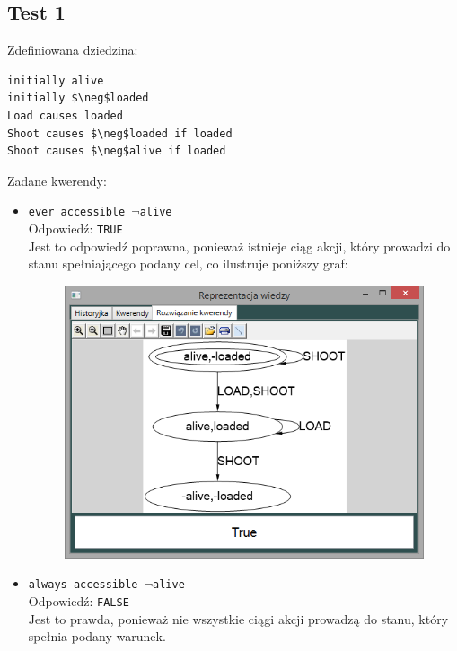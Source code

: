 \documentclass{article}
\begin{document}
\subsection{Test 1}
Zdefiniowana dziedzina:
\bigskip
{}
\begin{lstlisting}[mathescape=true]
initially alive
initially $\neg$loaded
Load causes loaded
Shoot causes $\neg$loaded if loaded
Shoot causes $\neg$alive if loaded
\end{lstlisting}
\vspace{1cm}
Zadane kwerendy:
\begin{itemize}
    \item {\large\texttt{ever accessible $\neg$alive}}\\
    Odpowiedź: \texttt{TRUE}\\
    Jest to odpowiedź poprawna, ponieważ istnieje ciąg akcji, który prowadzi do stanu spełniającego podany cel, co ilustruje poniższy graf:
    \begin{figure}[H]
    \centering
    \includegraphics[scale=0.5]{test1_1}
    \end{figure}
    \item {\large\texttt{always accessible $\neg$alive}}\\
    Odpowiedź: \texttt{FALSE}\\
    Jest to prawda, ponieważ nie wszystkie ciągi akcji prowadzą do stanu, który spełnia podany warunek.
    \begin{figure}[H]
    \centering

\end{figure}
\end{itemize}
\end{document}
